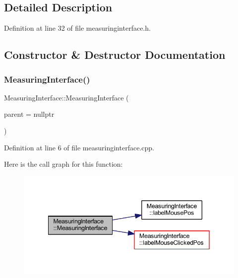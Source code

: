 \subsection{Detailed Description}


Definition at line 32 of file measuringinterface.\+h.



\subsection{Constructor \& Destructor Documentation}
\mbox{\label{class_measuring_interface_ad1093726e69352028a38b18a5294a6ac}} 
\subsubsection{\texorpdfstring{MeasuringInterface()}{MeasuringInterface()}}
{\footnotesize\ttfamily Measuring\+Interface\+::\+Measuring\+Interface (\begin{DoxyParamCaption}\item[{Q\+Widget $\ast$}]{parent = {\ttfamily nullptr} }\end{DoxyParamCaption})\hspace{0.3cm}{\ttfamily [explicit]}}



Definition at line 6 of file measuringinterface.\+cpp.

Here is the call graph for this function\+:\nopagebreak
\begin{figure}[H]
\begin{center}
\leavevmode
\includegraphics[width=342pt]{class_measuring_interface_ad1093726e69352028a38b18a5294a6ac_cgraph}
\end{center}
\end{figure}
\mbox{\label{class_measuring_interface_ac2538499814171168011c4e26731a084}} 
